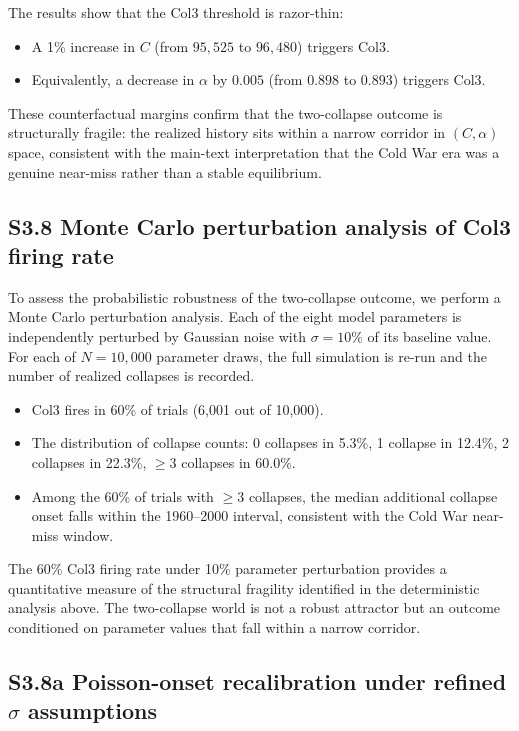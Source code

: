 \documentclass[11pt]{article}
\begin{document}
The results show that the Col3 threshold is razor-thin:
\begin{itemize}[leftmargin=2em]
\item A 1\% increase in $C$ (from $95{,}525$ to $96{,}480$) triggers Col3.
\item Equivalently, a decrease in $\alpha$ by $0.005$ (from $0.898$ to $0.893$) triggers Col3.
\end{itemize}

\noindent These counterfactual margins confirm that the two-collapse outcome is structurally fragile: the realized history sits within a narrow corridor in $(C,\alpha)$ space, consistent with the main-text interpretation that the Cold War era was a genuine near-miss rather than a stable equilibrium.

\subsection*{S3.8 Monte Carlo perturbation analysis of Col3 firing rate}

To assess the probabilistic robustness of the two-collapse outcome, we perform a Monte Carlo perturbation analysis.
Each of the eight model parameters is independently perturbed by Gaussian noise with $\sigma = 10\%$ of its baseline value.
For each of $N = 10{,}000$ parameter draws, the full simulation is re-run and the number of realized collapses is recorded.

\begin{itemize}[leftmargin=2em]
\item Col3 fires in 60\% of trials (6,001 out of 10,000).
\item The distribution of collapse counts: 0 collapses in 5.3\%, 1 collapse in 12.4\%, 2 collapses in 22.3\%, $\ge 3$ collapses in 60.0\%.
\item Among the 60\% of trials with $\ge 3$ collapses, the median additional collapse onset falls within the 1960--2000 interval, consistent with the Cold War near-miss window.
\end{itemize}

\noindent The 60\% Col3 firing rate under 10\% parameter perturbation provides a quantitative measure of the structural fragility identified in the deterministic analysis above.
The two-collapse world is not a robust attractor but an outcome conditioned on parameter values that fall within a narrow corridor.

\subsection*{S3.8a Poisson-onset recalibration under refined $\sigma$ assumptions}
\end{document}
